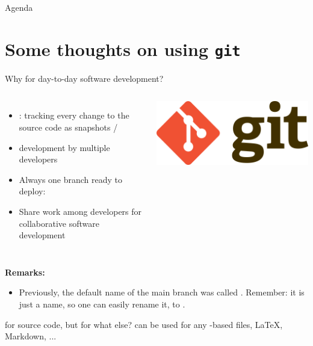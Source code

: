 \begin{frame}{Agenda}
\tableofcontents
\end{frame}

\section{Some thoughts on using \texttt{git}}

\begin{frame}{Why  for day-to-day software development?}
\begin{columns}
\begin{itemize}
\item {}: tracking every change to the source code as snapshots / 
\item {} development by multiple developers
\item Always one branch ready to deploy: 
\item Share work among developers for collaborative software development
\end{itemize}
\includegraphics[width=\columnwidth]{images/logo_git.png}
\end{columns}

\vspace{1em}
\textbf{Remarks:}
\begin{itemize}
\item Previously, the default name of the main branch was called . Remember: it is just a name, so one can easily rename it, {\eg} to .
\end{itemize}

\begin{block}{ for source code, but for what else?}
 can be used for any -based files, {\eg} \LaTeX, Markdown, ...
\end{block}
\end{frame}

